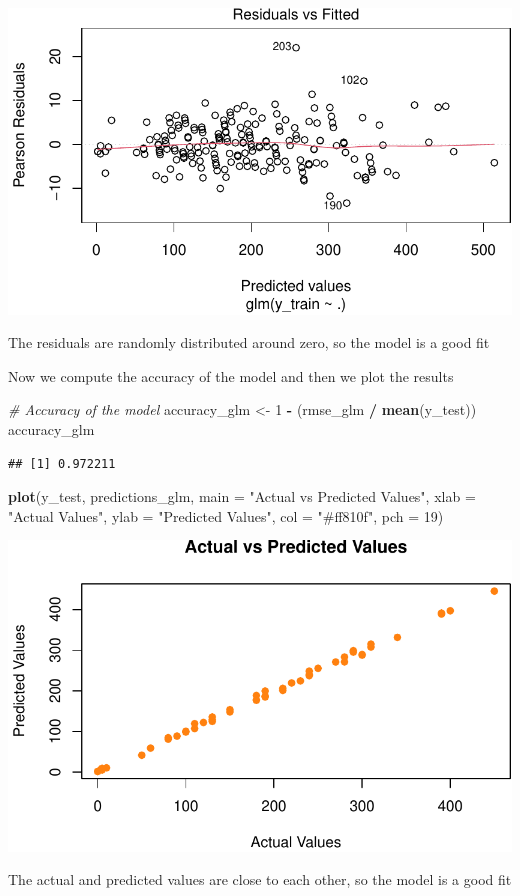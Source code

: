 \documentclass[
]{article}
\newenvironment{Shaded}{\begin{snugshade}}{\end{snugshade}}
\newcommand{\AttributeTok}[1]{\textcolor[rgb]{0.13,0.29,0.53}{#1}}
\newcommand{\CommentTok}[1]{\textcolor[rgb]{0.56,0.35,0.01}{\textit{#1}}}
\newcommand{\DecValTok}[1]{\textcolor[rgb]{0.00,0.00,0.81}{#1}}
\newcommand{\FunctionTok}[1]{\textcolor[rgb]{0.13,0.29,0.53}{\textbf{#1}}}
\newcommand{\NormalTok}[1]{#1}
\newcommand{\OtherTok}[1]{\textcolor[rgb]{0.56,0.35,0.01}{#1}}
\newcommand{\SpecialCharTok}[1]{\textcolor[rgb]{0.81,0.36,0.00}{\textbf{#1}}}
\newcommand{\StringTok}[1]{\textcolor[rgb]{0.31,0.60,0.02}{#1}}
\begin{document}
\begin{center}\includegraphics{Statistical_Learning_Final_Report_files/figure-latex/model_evaluation_glm-1} \end{center}

The residuals are randomly distributed around zero, so the model is a
good fit

Now we compute the accuracy of the model and then we plot the results

\begin{Shaded}
\begin{Highlighting}[]
\CommentTok{\# Accuracy of the model}
\NormalTok{accuracy\_glm }\OtherTok{\textless{}{-}} \DecValTok{1} \SpecialCharTok{{-}}\NormalTok{ (rmse\_glm }\SpecialCharTok{/} \FunctionTok{mean}\NormalTok{(y\_test))}
\NormalTok{accuracy\_glm}
\end{Highlighting}
\end{Shaded}

\begin{verbatim}
## [1] 0.972211
\end{verbatim}

\begin{Shaded}
\begin{Highlighting}[]
\FunctionTok{plot}\NormalTok{(y\_test, predictions\_glm, }\AttributeTok{main =} \StringTok{"Actual vs Predicted Values"}\NormalTok{,}
     \AttributeTok{xlab =} \StringTok{"Actual Values"}\NormalTok{, }\AttributeTok{ylab =} \StringTok{"Predicted Values"}\NormalTok{,}
     \AttributeTok{col =} \StringTok{"\#ff810f"}\NormalTok{, }\AttributeTok{pch =} \DecValTok{19}\NormalTok{)}
\end{Highlighting}
\end{Shaded}

\begin{center}\includegraphics{Statistical_Learning_Final_Report_files/figure-latex/accuracy_glm-1} \end{center}

The actual and predicted values are close to each other, so the model is
a good fit
\end{document}
